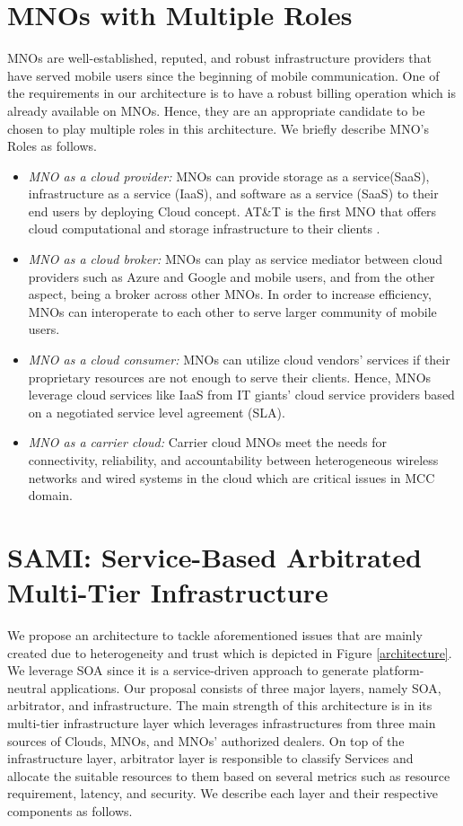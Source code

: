 \documentclass[conference]{IEEEtran}
\begin{document}
\section{MNOs with Multiple Roles}
MNOs are well-established, reputed, and robust infrastructure providers that have served mobile users since the beginning of mobile communication. One of the requirements in our architecture is to have a robust billing operation which is already available on MNOs. Hence, they are an appropriate candidate to be chosen to play multiple roles in this architecture. We briefly describe MNO's Roles as follows.

\begin{itemize}

\item{\textit{MNO as a cloud provider:}} MNOs can provide storage as a service(SaaS), infrastructure as a service (IaaS), and software as a service (SaaS) to their end users by deploying Cloud concept. AT\&T is the first MNO that offers cloud computational and storage infrastructure to their clients \cite{ATT1}.

\item{\textit{MNO as a cloud broker:}} MNOs can play as service mediator between cloud providers such as Azure and Google and mobile users, and from the other aspect, being a broker across other MNOs. In order to increase efficiency, MNOs can interoperate to each other to serve larger community of mobile users.

\item{\textit{MNO as a cloud consumer:}} MNOs can utilize cloud vendors' services if their proprietary resources are not enough to serve their clients. Hence, MNOs leverage cloud services like IaaS from IT giants' cloud service providers based on a negotiated service level agreement (SLA).

\item{\textit{MNO as a carrier cloud:}} Carrier cloud MNOs meet the needs for connectivity, reliability, and accountability between heterogeneous wireless networks and wired systems in the cloud which are critical issues in MCC domain. 
\end{itemize}

\section{SAMI: Service-Based Arbitrated Multi-Tier Infrastructure}
We propose an architecture to tackle aforementioned issues that are mainly created due to heterogeneity and trust which is depicted in Figure  \ref{architecture}. We leverage SOA since it is a service-driven approach to generate platform-neutral applications. Our proposal consists of three major layers, namely SOA, arbitrator, and infrastructure. The main strength of this architecture is in its multi-tier infrastructure layer which leverages infrastructures from three main sources of Clouds, MNOs, and MNOs' authorized dealers. On top of the infrastructure layer, arbitrator layer is responsible to classify Services and allocate the suitable resources to them based on several metrics such as resource requirement, latency, and security. We describe each layer and their respective components as follows.
\end{document}
